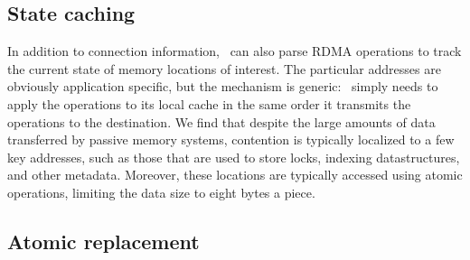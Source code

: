 
\subsection{State caching}

In addition to connection information, \sword\ can also parse RDMA
operations to track the current state of memory locations of interest.
The particular addresses are obviously application specific, but the
mechanism is generic: \sword\ simply needs to apply the operations to
its local cache in the same order it transmits the operations to the
destination.  We find that despite the large amounts of data
transferred by passive memory systems, contention is typically
localized to a few key addresses, such as those that are used to store
locks, indexing datastructures, and other metadata.  Moreover, these
locations are typically accessed using atomic operations, limiting
the data size to eight bytes a piece.





\subsection{Atomic replacement}
\label{ss:rewrite}

